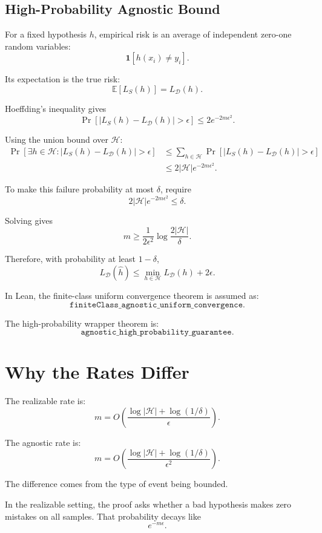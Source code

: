 \documentclass[11pt]{article}
\newcommand{\Hclass}{\mathcal{H}}
\newcommand{\Ddist}{\mathcal{D}}
\newcommand{\LD}{L_{\Ddist}}
\newcommand{\LS}{L_S}
\newcommand{\hh}{\widehat{h}}
\newcommand{\eps}{\epsilon}
\newcommand{\ind}{\mathbf{1}}
\theoremstyle{definition}
\begin{document}
\subsection{High-Probability Agnostic Bound}

For a fixed hypothesis $h$, empirical risk is an average of independent
zero-one random variables:
\[
  \ind[h(x_i)\ne y_i].
\]

Its expectation is the true risk:
\[
  \mathbb{E}[\LS(h)] = \LD(h).
\]

Hoeffding's inequality gives
\[
  \Pr\left[|\LS(h)-\LD(h)|>\eps\right]
  \le
  2e^{-2m\eps^2}.
\]

Using the union bound over $\Hclass$:
\[
\begin{aligned}
  \Pr\left[
    \exists h\in\Hclass :
    |\LS(h)-\LD(h)|>\eps
  \right]
  &\le
  \sum_{h\in\Hclass}
  \Pr\left[|\LS(h)-\LD(h)|>\eps\right] \\
  &\le
  2|\Hclass|e^{-2m\eps^2}.
\end{aligned}
\]

To make this failure probability at most $\delta$, require
\[
  2|\Hclass|e^{-2m\eps^2}\le \delta.
\]

Solving gives
\[
  m\ge
  \frac{1}{2\eps^2}
  \log\frac{2|\Hclass|}{\delta}.
\]

Therefore, with probability at least $1-\delta$,
\[
  \LD(\hh)
  \le
  \min_{h\in\Hclass}\LD(h)+2\eps.
\]

In Lean, the finite-class uniform convergence theorem is assumed as:
\[
  \texttt{finiteClass\_agnostic\_uniform\_convergence}.
\]

The high-probability wrapper theorem is:
\[
  \texttt{agnostic\_high\_probability\_guarantee}.
\]

\section{Why the Rates Differ}

The realizable rate is:
\[
  m =
  O\left(
    \frac{\log|\Hclass|+\log(1/\delta)}{\eps}
  \right).
\]

The agnostic rate is:
\[
  m =
  O\left(
    \frac{\log|\Hclass|+\log(1/\delta)}{\eps^2}
  \right).
\]

The difference comes from the type of event being bounded.

In the realizable setting, the proof asks whether a bad hypothesis makes zero
mistakes on all samples. That probability decays like
\[
  e^{-m\eps}.
\]
\end{document}
